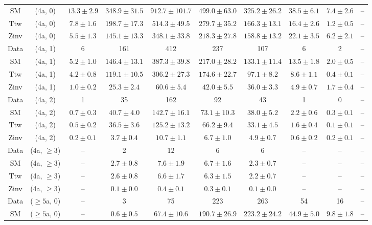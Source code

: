 \begin{table}[h!]
{\begin{tabular}{cccccccccc}
	SM & (4a, 0) & $13.3\pm 2.9$ & $348.9\pm 31.5$ & $912.7\pm 101.7$ & $499.0\pm 63.0$ & $325.2\pm 26.2$ & $38.5\pm 6.1$ & $7.4\pm 2.6$ & -- \\[0.5ex] 
	Ttw & (4a, 0) & $7.8\pm 1.6$ & $198.7\pm 17.3$ & $514.3\pm 49.5$ & $279.7\pm 35.2$ & $166.3\pm 13.1$ & $16.4\pm 2.6$ & $1.2\pm 0.5$ & -- \\[0.5ex] 
	Zinv & (4a, 0) & $5.5\pm 1.3$ & $145.1\pm 13.3$ & $348.1\pm 33.8$ & $218.3\pm 27.8$ & $158.8\pm 13.2$ & $22.1\pm 3.5$ & $6.2\pm 2.1$ & -- \\[0.5ex] 
	Data & (4a, 1) & 6 & 161 & 412 & 237 & 107 & 6 & 2 & -- \\[0.5ex] 
	SM & (4a, 1) & $5.2\pm 1.0$ & $146.4\pm 13.1$ & $387.3\pm 39.8$ & $217.0\pm 28.2$ & $133.1\pm 11.4$ & $13.5\pm 1.8$ & $2.0\pm 0.5$ & -- \\[0.5ex] 
	Ttw & (4a, 1) & $4.2\pm 0.8$ & $119.1\pm 10.5$ & $306.2\pm 27.3$ & $174.6\pm 22.7$ & $97.1\pm 8.2$ & $8.6\pm 1.1$ & $0.4\pm 0.1$ & -- \\[0.5ex] 
	Zinv & (4a, 1) & $1.0\pm 0.2$ & $25.3\pm 2.4$ & $60.6\pm 5.4$ & $42.0\pm 5.5$ & $36.0\pm 3.3$ & $4.9\pm 0.7$ & $1.7\pm 0.4$ & -- \\[0.5ex] 
	Data & (4a, 2) & 1 & 35 & 162 & 92 & 43 & 1 & 0 & -- \\[0.5ex] 
	SM & (4a, 2) & $0.7\pm 0.3$ & $40.7\pm 4.0$ & $142.7\pm 16.1$ & $73.1\pm 10.3$ & $38.0\pm 5.2$ & $2.2\pm 0.6$ & $0.3\pm 0.1$ & -- \\[0.5ex] 
	Ttw & (4a, 2) & $0.5\pm 0.2$ & $36.5\pm 3.6$ & $125.2\pm 13.2$ & $66.2\pm 9.4$ & $33.1\pm 4.5$ & $1.6\pm 0.4$ & $0.1\pm 0.1$ & -- \\[0.5ex] 
	Zinv & (4a, 2) & $0.2\pm 0.1$ & $3.7\pm 0.4$ & $10.7\pm 1.1$ & $6.7\pm 1.0$ & $4.9\pm 0.7$ & $0.6\pm 0.2$ & $0.2\pm 0.1$ & -- \\[0.5ex] 
	Data & (4a, $\ge3$) & -- & 2 & 12 & 6 & 6 & -- & -- & -- \\[0.5ex] 
	SM & (4a, $\ge3$) & -- & $2.7\pm 0.8$ & $7.6\pm 1.9$ & $6.7\pm 1.6$ & $2.3\pm 0.7$ & -- & -- & -- \\[0.5ex] 
	Ttw & (4a, $\ge3$) & -- & $2.6\pm 0.8$ & $6.6\pm 1.7$ & $6.3\pm 1.5$ & $2.2\pm 0.7$ & -- & -- & -- \\[0.5ex] 
	Zinv & (4a, $\ge3$) & -- & $0.1\pm 0.0$ & $0.4\pm 0.1$ & $0.3\pm 0.1$ & $0.1\pm 0.0$ & -- & -- & -- \\[0.5ex] 
	Data & ($\ge5$a, 0) & -- & 3 & 75 & 223 & 263 & 54 & 16 & -- \\[0.5ex] 
	SM & ($\ge5$a, 0) & -- & $0.6\pm 0.5$ & $67.4\pm 10.6$ & $190.7\pm 26.9$ & $223.2\pm 24.2$ & $44.9\pm 5.0$ & $9.8\pm 1.8$ & -- \\[0.5ex] 

\end{tabular}}
\end{table}
